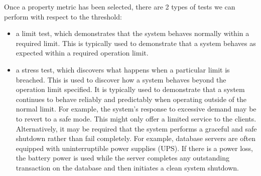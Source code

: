 \documentclass[a4paper, openany]{memoir}
\begin{document}
Once a property metric has been selected, there are 2 types of tests we can perform with respect to the threshold:
\begin{itemize}
    \item a limit test, which demonstrates that the system behaves normally within a required limit. This is typically used to demonstrate that a system behaves as expected within a required operation limit.
    \item a stress test, which discovers what happens when a particular limit is breached. This is used to discover how a system behaves beyond the operation limit specified. It is typically used to demonstrate that a system continues to behave reliably and predictably when operating outside of the normal limit. For example, the system's response to excessive demand may be to revert to a safe mode. This might only offer a limited service to the clients. Alternatively, it may be required that the system performs a graceful and safe shutdown rather than fail completely. For example, database servers are often equipped with uninterruptible power supplies (UPS). If there is a power loss, the battery power is used while the server completes any outstanding transaction on the database and then initiates a clean system shutdown.
\end{itemize}
\end{document}
